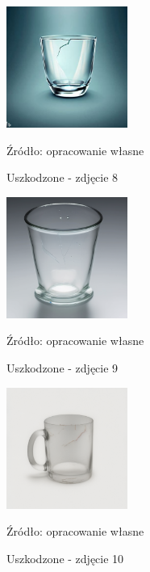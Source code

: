 \begin{figure}[htbp]
  \centering
  \caption{Uszkodzone - zdjęcie 8}
  \includegraphics[width=150px]{images/failure_8.png}
  \begin{center}
  \footnotesize{Źródło: opracowanie własne}
  \end{center}
  \label{fig:zdjecie_uszkodzone_8}
\end{figure}

\begin{figure}[htbp]
  \centering
  \caption{Uszkodzone - zdjęcie 9}
  \includegraphics[width=150px]{images/failure_9.png}
  \begin{center}
  \footnotesize{Źródło: opracowanie własne}
  \end{center}
  \label{fig:zdjecie_uszkodzone_9}
\end{figure}

\begin{figure}[htbp]
  \centering
  \caption{Uszkodzone - zdjęcie 10}
  \includegraphics[width=150px]{images/failure_10.png}
  \begin{center}
  \footnotesize{Źródło: opracowanie własne}
  \end{center}
  \label{fig:zdjecie_uszkodzone_10}
\end{figure}
